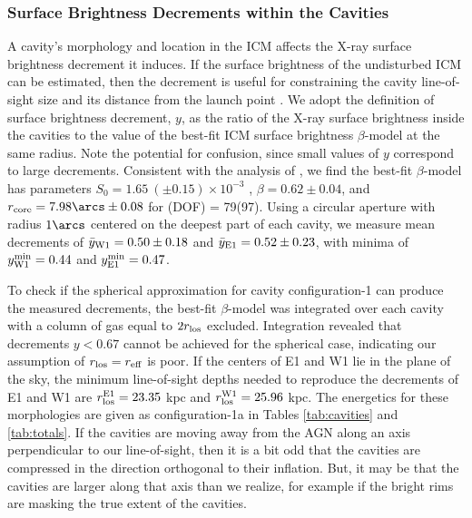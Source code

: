 \documentclass[11pt, preprint]{aastex}
\begin{document}
\subsubsection{Surface Brightness Decrements within the Cavities}
\label{sec:dec}

A cavity's morphology and location in the ICM affects the X-ray
surface brightness decrement it induces. If the surface brightness of
the undisturbed ICM can be estimated, then the decrement is useful for
constraining the cavity line-of-sight size and its distance from the
launch point \citep[\eg\ \rlos\ and $z$; see][for details]{hydraa}. We
adopt the \citet{hydraa} definition of surface brightness decrement,
$y$, as the ratio of the X-ray surface brightness inside the cavities
to the value of the best-fit ICM surface brightness $\beta$-model at
the same radius. Note the potential for confusion, since small values
of $y$ correspond to large decrements. Consistent with the analysis of
\citet{schindler01}, we find the best-fit $\beta$-model has parameters
$S_0 = 1.65 ~(\pm 0.15) \times 10^{-3}$ \sbr, $\beta = 0.62 \pm 0.04$,
and $r_{\rm{core}} = 7.98\arcs \pm 0.08$ for \chisq(DOF) =
79(97). Using a circular aperture with radius $1\arcs$ centered on the
deepest part of each cavity, we measure mean decrements of
$\bar{y}_{\rm{W1}} = 0.50 \pm 0.18$ and $\bar{y}_{\rm{E1}} = 0.52 \pm
0.23$, with minima of $y^{\rm{min}}_{\rm{W1}} = 0.44$ and
$y^{\rm{min}}_{\rm{E1}} = 0.47$.

To check if the spherical approximation for cavity configuration-1 can
produce the measured decrements, the best-fit $\beta$-model was
integrated over each cavity with a column of gas equal to $2r_{\rm{los}}$
excluded. Integration revealed that decrements $y < 0.67$ cannot be
achieved for the spherical case, indicating our assumption of $r_{\rm{los}} =
r_{\rm{eff}}$ is poor. If the centers of E1 and W1 lie in the plane of the
sky, the minimum line-of-sight depths needed to reproduce the
decrements of E1 and W1 are $r_{\rm{los}}^{\rm{E1}} = 23.35$ kpc and
$r_{\rm{los}}^{\rm{W1}} = 25.96$ kpc. The energetics for these morphologies
are given as configuration-1a in Tables \ref{tab:cavities} and
\ref{tab:totals}. If the cavities are moving away from the AGN along
an axis perpendicular to our line-of-sight, then it is a bit odd that
the cavities are compressed in the direction orthogonal to their
inflation. But, it may be that the cavities are larger along that axis
than we realize, for example if the bright rims are masking the true
extent of the cavities.
\end{document}
